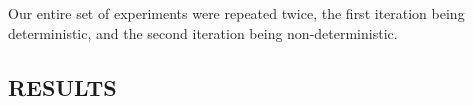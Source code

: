\documentclass[]{article}
\begin{document}
Our entire set of experiments were repeated twice, the first iteration being deterministic, and the second iteration being non-deterministic. 

\subsection{RESULTS}

%
%
\end{document}

